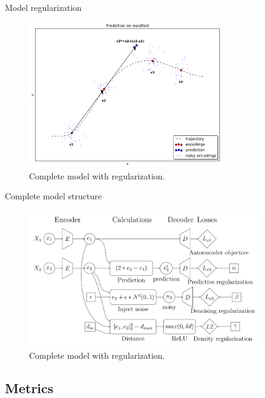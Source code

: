 \documentclass[pdftex, handout]{beamer}
\begin{document}
\begin{frame}{Model regularization}
  \begin{figure}
    \includegraphics[width=0.75\textwidth,height=0.75\textheight,keepaspectratio]{images_main/prediction.png}
    \caption{Complete model with regularization.}
  \end{figure}
\end{frame}


\begin{frame}{Complete model structure}
  \begin{figure}
    \includegraphics[width=0.9\textwidth,height=0.9\textheight,keepaspectratio]{images/model.png}
    \caption{Complete model with regularization.}
  \end{figure}
\end{frame}

\subsection{Metrics}

\begin{frame}
\end{frame}
\end{document}
